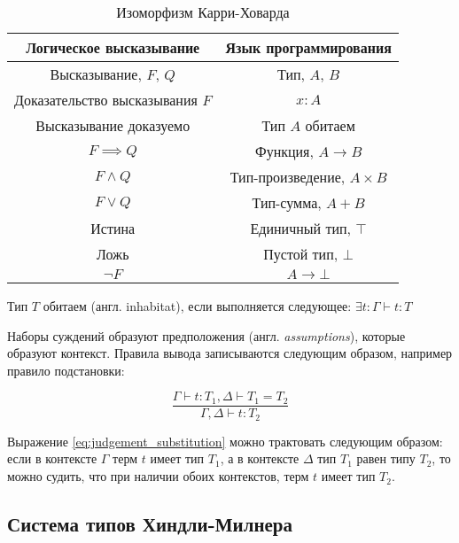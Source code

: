 \begin{table}[H]
    \centering
    \caption{Изоморфизм Карри-Ховарда}
    \label{tab:curry-hovard-iso}
    \begin{tabular}{|c|c|}
        \hline
        \textbf{Логическое высказывание} & \textbf{Язык программирования} \\\hline
        Высказывание, $F$, $Q$           & Тип, $A$, $B$                  \\\hline
        Доказательство высказывания $F$  & $x: A$                         \\\hline
        Высказывание доказуемо           & Тип $A$ обитаем                \\\hline
        $F \implies Q$                   & Функция, $A \to B$             \\\hline
        $F \wedge Q$                     & Тип-произведение, $A \times B$ \\\hline
        $F \vee Q$                       & Тип-сумма, $A + B$             \\\hline
        Истина                           & Единичный тип, $\top$          \\\hline
        Ложь                             & Пустой тип, $\bot$             \\\hline
        $\neg F$                         & $A \to \bot$                   \\\hline
    \end{tabular}
\end{table}

Тип $T$ обитаем (англ. inhabitat), если выполняется следующее: $\exists t: \Gamma \vdash t: T$

Наборы суждений образуют предположения (англ. \textit{assumptions}), которые образуют контекст.
Правила вывода записываются следующим образом, например правило подстановки:

\begin{equation}
    \label{eq:judgement_substitution}
    \frac{\Gamma \vdash t: T_1, \Delta \vdash T_1 = T_2}{\Gamma, \Delta \vdash t: T_2}
\end{equation}

Выражение \ref{eq:judgement_substitution} можно трактовать следующим образом: если в контексте $\Gamma$ терм $t$ имеет тип $T_1$, а в контексте $\Delta$ тип $T_1$ равен типу $T_2$, то можно судить, что при наличии обоих контекстов, терм $t$ имеет тип $T_2$.

\subsection{Система типов Хиндли-Милнера}
\label{subsec:hindley-milner}

